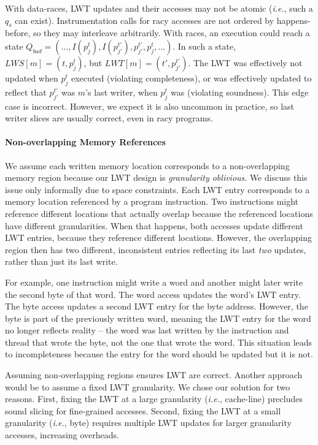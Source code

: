 \documentclass[preprint,9pt]{sigplanconf}
\newcommand{\lwt}{LWT\xspace}
\begin{document}
With data-races, \lwt updates and their accesses may not be atomic ({\em i.e.},
such a $q_s$ can exist).  Instrumentation calls for racy accesses are not
ordered by happens-before, so they may interleave arbitrarily.  With races, an
execution could reach a state $Q_{bad} = (\ldots, I(p^{t}_{j}), I(p^{t'}_{j'}),
p^{t'}_{j'}, p^{t}_{j}, \ldots)$.  In such a state, $LWS[m] = (t,p^{t}_{j})$,
but $LWT[m] = (t',p^{t'}_{j'})$.  The \lwt was effectively not updated when
$p^{t}_{j}$ executed (violating completeness), or was effectively updated to
reflect that $p^{t'}_{j'}$ was $m$'s last writer, when $p^{t}_{j}$ was
(violating soundness).  This edge case is incorrect. However, we expect it is
also uncommon in practice, so last writer slices are usually correct, even in
racy programs.

\paragraph{Non-overlapping Memory References} 
We assume each written memory location corresponds to a non-overlapping memory
region because our \lwt design is {\em granularity oblivious}.  We discuss this
issue only informally due to space constraints.  Each \lwt entry corresponds to
a memory location referenced by a program instruction.  Two instructions might
reference different locations that actually overlap because the referenced
locations have different granularities.  When that happens, both accesses
update different \lwt entries, because they reference different locations.
However, the overlapping region then has two different, inconsistent entries
reflecting its last {\em two} updates, rather than just its last write.

For example, one instruction might write a word and another might later write
the second byte of that word.  The word access updates the word's \lwt entry.
The byte access updates a second \lwt entry for the byte address.  However, the
byte is part of the previously written word, meaning the \lwt entry for the
word no longer reflects reality -- the word was last written by the instruction
and thread that wrote the byte, not the one that wrote the word.  This
situation leads to incompleteness because the entry for the word should be
updated but it is not.

Assuming non-overlapping regions ensures \lwt are correct.  Another
approach would be to assume a fixed \lwt granularity.  We chose our solution
for two reasons.  First, fixing the \lwt at a large granularity ({\em i.e.},
cache-line) precludes sound slicing for fine-grained accesses.  Second, fixing
the \lwt at a small granularity ({\em i.e.}, byte) requires multiple \lwt
updates for larger granularity accesses, increasing overheads.
\end{document}
